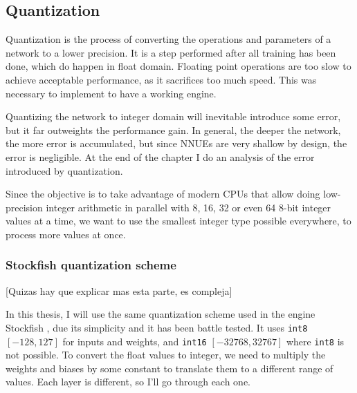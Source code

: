 \subsection{Quantization}


Quantization is the process of converting the operations and parameters of a network to a lower precision. It is a step performed after all training has been done, which do happen in float domain. Floating point operations are too slow to achieve acceptable performance, as it sacrifices too much speed. This was necessary to implement to have a working engine.

Quantizing the network to integer domain will inevitable introduce some error, but it far outweights the performance gain. In general, the deeper the network, the more error is accumulated, but since NNUEs are very shallow by design, the error is negligible. At the end of the chapter I do an analysis of the error introduced by quantization.

Since the objective is to take advantage of modern CPUs that allow doing low-precision integer arithmetic in parallel with 8, 16, 32 or even 64 8-bit integer values at a time, we want to use the smallest integer type possible everywhere, to process more values at once.

\subsubsection{Stockfish quantization scheme}

[Quizas hay que explicar mas esta parte, es compleja]

\def\int#1{\texttt{int#1}}

In this thesis, I will use the same quantization scheme used in the engine Stockfish \cite{nnue-pytorch}, due its simplicity and it has been battle tested. It uses \int{8} $[-128, 127]$ for inputs and weights, and \int{16} $[-32768, 32767]$ where \int{8} is not possible.
To convert the float values to integer, we need to multiply the weights and biases by some constant to translate them to a different range of values. Each layer is different, so I'll go through each one.



